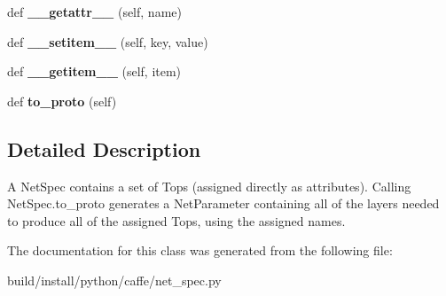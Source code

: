 \begin{DoxyCompactItemize}
def {\bfseries \+\_\+\+\_\+getattr\+\_\+\+\_\+} (self, name)
\item 
\mbox{\label{classcaffe_1_1net__spec_1_1_net_spec_a1ed26dc795844001d80caa94c2a09c07}} 
def {\bfseries \+\_\+\+\_\+setitem\+\_\+\+\_\+} (self, key, value)
\item 
\mbox{\label{classcaffe_1_1net__spec_1_1_net_spec_a59d620a6ebd0241f1713d323eaae0b84}} 
def {\bfseries \+\_\+\+\_\+getitem\+\_\+\+\_\+} (self, item)
\item 
\mbox{\label{classcaffe_1_1net__spec_1_1_net_spec_a9271c9d1decd376def5d8cf894cde091}} 
def {\bfseries to\+\_\+proto} (self)
\end{DoxyCompactItemize}


\subsection{Detailed Description}
\begin{DoxyVerb}A NetSpec contains a set of Tops (assigned directly as attributes).
Calling NetSpec.to_proto generates a NetParameter containing all of the
layers needed to produce all of the assigned Tops, using the assigned
names.\end{DoxyVerb}
 

The documentation for this class was generated from the following file\+:\begin{DoxyCompactItemize}
\item 
build/install/python/caffe/net\+\_\+spec.\+py\end{DoxyCompactItemize}
